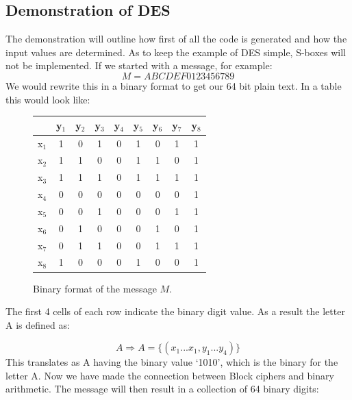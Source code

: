 \documentclass[11pt,a4paper, notitlepage]{report}
\begin{document}
\subsection{Demonstration of DES}
\label{subsec: DemoDES}

The demonstration will outline how first of all the code is generated and how the input values are determined. As to keep the example of DES simple, S-boxes will not be implemented. If we started with a message, for example:
\begin{displaymath}
M = ABCDEF0123456789
\end{displaymath}
We would rewrite this in a binary format to get our 64 bit plain text. In a table this would look like:





\begin{figure}[H]
\centering
\label{tab:BFormat}
\begin{tabular}{ |c|c|c|c|c|c|c|c|c| }
\hline
  {} & y$_{1}$ & y$_{2}$ & y$_{3}$ & y$_{4}$ & y$_{5}$ & y$_{6}$ & y$_{7}$ & y$_{8}$ \\ \hline
  x$_{1}$ & 1 & 0 & 1 & 0 & 1 & 0 & 1 & 1 \\ \hline
  x$_{2}$ & 1 & 1 & 0 & 0 & 1 & 1 & 0 & 1 \\ \hline
  x$_{3}$ & 1 & 1 & 1 & 0 & 1 & 1 & 1 & 1 \\ \hline
  x$_{4}$ & 0 & 0 & 0 & 0 & 0 & 0 & 0 & 1 \\ \hline
  x$_{5}$ & 0 & 0 & 1 & 0 & 0 & 0 & 1 & 1 \\ \hline
  x$_{6}$ & 0 & 1 & 0 & 0 & 0 & 1 & 0 & 1 \\ \hline
  x$_{7}$ & 0 & 1 & 1 & 0 & 0 & 1 & 1 & 1 \\ \hline
  x$_{8}$ & 1 & 0 & 0 & 0 & 1 & 0 & 0 & 1 \\ \hline
\end{tabular}
\caption{Binary format of the message $M$.}
\end{figure}

The first 4 cells of each row indicate the binary digit value. As a result the letter A is defined as:

\begin{displaymath}
A \Rightarrow A = \{(x_{1}...x_{1}, y_{1}...y_{4})\}
\end{displaymath}
This translates as A having the binary value `1010', which is the binary for the letter A. Now we have made the connection between Block ciphers and binary arithmetic. The message will then result in a collection of 64 binary digits:
\end{document}
